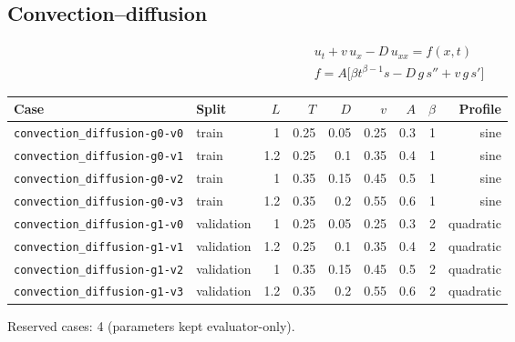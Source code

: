\documentclass[11pt]{article}
\begin{document}
\subsection{Convection--diffusion}
\begin{align*}
u_t + v\,u_x - D\,u_{xx} = f(x,t)\\
f = A\bigl[\beta t^{\beta-1}s - D\,g\,s'' + v\,g\,s'\bigr]
\end{align*}
\begin{center}\small
\begin{tabular}{llrrrrrrr}
\toprule
Case & Split & $L$ & $T$ & $D$ & $v$ & $A$ & $\beta$ & Profile \\
\midrule
\texttt{convection\_diffusion-g0-v0} & train & 1 & 0.25 & 0.05 & 0.25 & 0.3 & 1 & sine \\
\texttt{convection\_diffusion-g0-v1} & train & 1.2 & 0.25 & 0.1 & 0.35 & 0.4 & 1 & sine \\
\texttt{convection\_diffusion-g0-v2} & train & 1 & 0.35 & 0.15 & 0.45 & 0.5 & 1 & sine \\
\texttt{convection\_diffusion-g0-v3} & train & 1.2 & 0.35 & 0.2 & 0.55 & 0.6 & 1 & sine \\
\texttt{convection\_diffusion-g1-v0} & validation & 1 & 0.25 & 0.05 & 0.25 & 0.3 & 2 & quadratic \\
\texttt{convection\_diffusion-g1-v1} & validation & 1.2 & 0.25 & 0.1 & 0.35 & 0.4 & 2 & quadratic \\
\texttt{convection\_diffusion-g1-v2} & validation & 1 & 0.35 & 0.15 & 0.45 & 0.5 & 2 & quadratic \\
\texttt{convection\_diffusion-g1-v3} & validation & 1.2 & 0.35 & 0.2 & 0.55 & 0.6 & 2 & quadratic \\
\bottomrule
\end{tabular}
\end{center}
\noindent Reserved cases: 4 (parameters kept evaluator-only).
\end{document}
